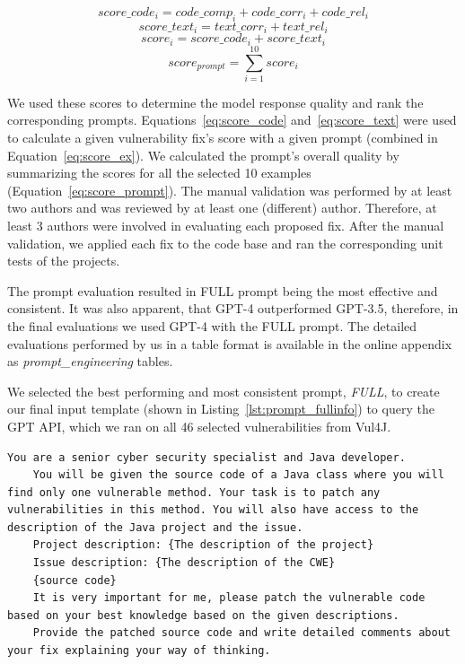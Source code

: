 \begin{equation}
	\label{eq:score_code}
	score\_code_{i} = code\_comp_{i} + code\_corr_{i} + code\_rel_{i}
\end{equation}
\begin{equation}
	\label{eq:score_text}
	score\_text_{i} = text\_corr_{i} + text\_rel_{i} 
\end{equation}
\begin{equation}
	\label{eq:score_ex}
	score_{i} = score\_code_{i} + score\_text_{i}
\end{equation}
\begin{equation}
	\label{eq:score_prompt}
	score_{prompt} = \sum_{i=1}^{10}score_i
\end{equation}

We used these scores to determine the model response quality and rank the corresponding prompts.
Equations~\ref{eq:score_code} and~\ref{eq:score_text} were used to calculate a given vulnerability fix's score with a given prompt (combined in Equation~\ref{eq:score_ex}).
We calculated the prompt's overall quality by summarizing the scores for all the selected 10 examples (Equation~\ref{eq:score_prompt}).
The manual validation was performed by at least two authors and was reviewed by at least one (different) author.
Therefore, at least 3 authors were involved in evaluating each proposed fix.
After the manual validation, we applied each fix to the code base and ran the corresponding unit tests of the projects.

The prompt evaluation resulted in FULL prompt being the most effective and consistent.
It was also apparent, that GPT-4 outperformed GPT-3.5, therefore, in the final evaluations we used GPT-4 with the FULL prompt.
The detailed evaluations performed by us in a table format is available in the online appendix as \textit{prompt\_engineering} tables.


We selected the best performing and most consistent prompt, \textit{FULL}, to create our final input template (shown in Listing~\ref{lst:prompt_fullinfo}) to query the GPT API, which we ran on all 46 selected vulnerabilities from Vul4J.

\begin{lstlisting}[caption={Template of the most effective prompt (FULL).},label=lst:prompt_fullinfo,captionpos=b, breaklines=true]
	You are a senior cyber security specialist and Java developer.
	You will be given the source code of a Java class where you will find only one vulnerable method. Your task is to patch any vulnerabilities in this method. You will also have access to the description of the Java project and the issue. 
	Project description: {The description of the project}
	Issue description: {The description of the CWE}
	{source code}
	It is very important for me, please patch the vulnerable code based on your best knowledge based on the given descriptions.
	Provide the patched source code and write detailed comments about your fix explaining your way of thinking.
\end{lstlisting}

